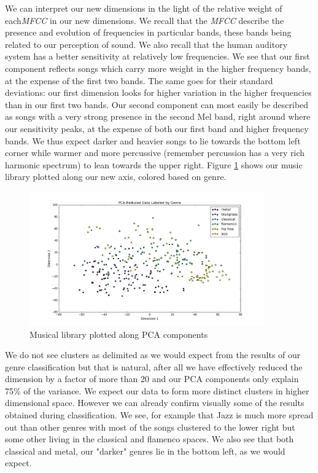 \documentclass[12pt]{article}
\begin{document}
We can interpret our new dimensions in the light of the relative weight of each\textit{MFCC} in our new dimensions. We recall that the \textit{MFCC} describe the presence and evolution of frequencies in particular bands, these bands being related to our perception of sound. We also recall that the human auditory system has a better sensitivity at relatively low frequencies. We see that our first component reflects songs which carry more weight in the higher frequency bands, at the expense of the first two bands. The same goes for their standard deviations: our first dimension looks for higher variation in the higher frequencies than in our first two bands. Our second component can most easily be described as songs with a very strong presence in the second Mel band, right around where our sensitivity peaks, at the expense of both our first band and higher frequency bands. We thus expect darker and heavier songs to lie towards the bottom left corner while warmer and more percussive (remember percussion has a very rich harmonic spectrum) to lean towards the upper right. Figure \ref{plot_genres} shows our music library plotted along our new axis, colored based on genre.
\begin{figure}
\centering
  \includegraphics[width=0.9\textwidth]{plot_genres.png}
  \caption{Musical library plotted along PCA components}
  \label{plot_genres}
\end{figure}
\medskip

We do not see clusters as delimited as we would expect from the results of our genre classification but that is natural, after all we have effectively reduced the dimension by a factor of more than 20 and our PCA components only explain 75\% of the variance. We expect our data to form more distinct clusters in higher dimensional space. However we can already confirm visually some of the results obtained during classification. We see, for example that Jazz is much more spread out than other genres with most of the songs clustered to the lower right but some other living in the classical and flamenco spaces. We also see that both classical and metal, our "darker" genres lie in the bottom left, as we would expect.
\medskip
\end{document}
